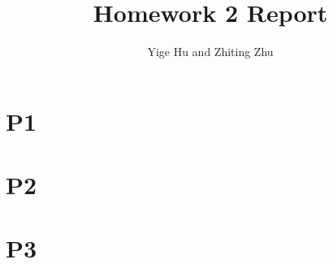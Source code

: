 \documentclass{article}
\begin{document}
\title{Homework 2 Report}
\author{Yige Hu and Zhiting Zhu}
\date{}
\maketitle

\section{P1}

\section{P2}

\section{P3}
\end{document}
